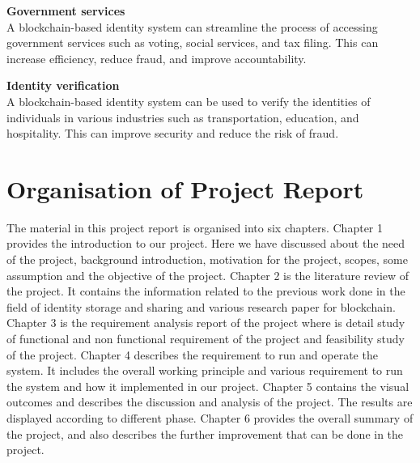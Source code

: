 \textbf{Government services}\\
    A blockchain-based identity system can streamline the process of accessing government services such as voting, social services, and tax filing. This can increase efficiency, reduce fraud, and improve accountability. 

\textbf{Identity verification}\\
 A blockchain-based identity system can be used to verify the identities of individuals in various industries such as transportation, education, and hospitality. This can improve security and reduce the risk of fraud.





\section{Organisation of Project Report}
The material in this project report is organised into six chapters. Chapter 1 provides  the  introduction  to our  project.  Here  we  have  discussed about  the  need  of  the project,  background  introduction,  motivation  for  the project, scopes, some assumption and the objective of the project. Chapter 2 is the literature review  of  the  project.  It  contains  the  information related to the previous work done in the field of identity storage and sharing and various research paper for blockchain. Chapter 3 is the requirement analysis report of the project where is detail study of functional and non functional requirement of the project and  feasibility study of the project.  Chapter 4 describes the requirement to run and operate the system. It includes the  overall  working principle and various requirement to run the system and how it implemented in our project. Chapter 5 contains the visual outcomes and describes the discussion and analysis of the project. The results are displayed according to different phase. Chapter 6 provides the overall summary of the project, and also describes the further improvement that can be done in the project.


